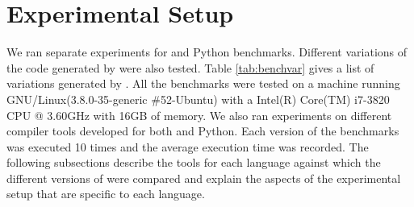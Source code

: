 \section{Experimental Setup}
We ran separate experiments for \matlab and Python benchmarks. Different variations of the code generated by \velocty were also tested. Table \ref{tab:benchvar} gives a list of variations generated by \velocty. All the benchmarks were tested on a machine running GNU/Linux(3.8.0-35-generic \#52-Ubuntu) with a Intel(R) Core(TM) i7-3820 CPU @ 3.60GHz with 16GB of memory. We also ran experiments on different compiler tools developed for both \matlab and Python. Each version of the benchmarks was executed 10 times and the average execution time was recorded. The following subsections describe the tools for each language against which the different versions of \velocty were compared and explain the aspects of the experimental setup that are specific to each language.

